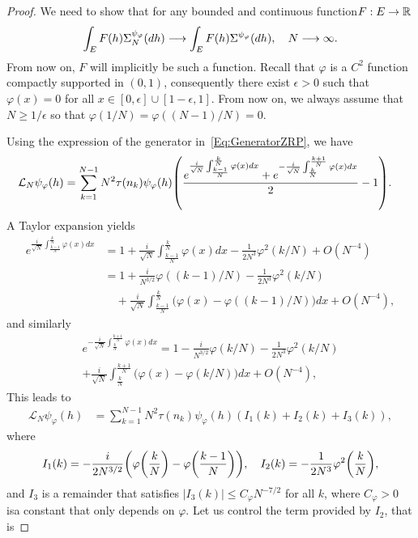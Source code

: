 \documentclass[10pt]{amsart}
\theoremstyle{definition}\newtheorem{defi}[theo]{Definition}\newtheorem{rema}[theo]{Remark}\newtheorem{exam}[theo]{Example}\newtheorem{exem}[theo]{Example}\newtheorem{nota}[theo]{Notation}
\theoremstyle{plain}
\newcommand{\cL}{\mathcal{L}}
\newcommand{\R}{\mathbb{R}}
\let\originalleft\left
\let\originalright\right
\renewcommand{\left}{\mathopen{}\mathclose\bgroup\originalleft}
\renewcommand{\right}{\aftergroup\egroup\originalright}
\renewcommand*{\to}{\mathchoice{\longrightarrow}{\rightarrow}{\rightarrow}{\rightarrow}}
\begin{document}
\begin{proof}
We need to show that for any bounded and continuous function\linebreak ${F:E\to\R}$
\[
\int_E F(h) \Sigma_N^{\psi_\varphi}(dh) \to \int_E F(h) \Sigma^{\psi_\varphi}(dh),\quad N\to\infty.
\]
From now on, $F$ will implicitly be such a function. Recall that $\varphi$ is a $C^2$ function compactly supported in $(0,1)$, consequently there exist $\epsilon > 0$ such that $\varphi(x) = 0$ for all $x\in [0,\epsilon]\cup [1-\epsilon,1]$. From now on, we always assume that $N\ge 1/\epsilon$ so that $\varphi(1/N) = \varphi((N-1)/N) = 0$.

Using the expression of the generator in~\eqref{Eq:GeneratorZRP}, we have
\begin{align*}
\cL_N \psi_\varphi(h) &= \sum_{k = 1}^{N-1} N^2\tau(n_k) \psi_\varphi(h) \left(\frac{e^{\frac{i}{\sqrt{N}}\int_{\frac{k-1}{N}}^{\frac{k}{N}} \varphi(x)dx} + e^{-\frac{i}{\sqrt{N}}\int_{\frac{k}{N}}^{\frac{k+1}{N}} \varphi(x)dx}}{2} -1 \right).
\end{align*}
A Taylor expansion yields
\begin{align*}
e^{\frac{i}{\sqrt{N}}\int_{\frac{k-1}{N}}^{\frac{k}{N}} \varphi(x)dx} &= 1 + \frac{i}{\sqrt{N}}\int_{\frac{k-1}{N}}^{\frac{k}{N}} \varphi(x)dx - \frac1{2N^3} \varphi^2(k/N) + O(N^{-4})\\
&= 1 + \frac{i}{N^{3/2}} \varphi((k-1)/N) - \frac1{2N^3} \varphi^2(k/N)\\
&\quad+ \frac{i}{\sqrt{N}}\int_{\frac{k-1}{N}}^{\frac{k}{N}} \bigl(\varphi(x)-\varphi((k-1)/N)\bigr)dx + O(N^{-4}),
\end{align*}
and similarly
\begin{multline*}
e^{-\frac{i}{\sqrt{N}}\int_{\frac{k}{N}}^{\frac{k+1}{N}} \varphi(x)dx} = 1 - \frac{i}{N^{3/2}} \varphi(k/N) - \frac1{2N^3} \varphi^2(k/N)\\
+ \frac{i}{\sqrt{N}}\int_{\frac{k}{N}}^{\frac{k+1}{N}} \bigl(\varphi(x)-\varphi(k/N)\bigr)dx + O(N^{-4}),
\end{multline*}
This leads to
\begin{align*}
\cL_N \psi_\varphi(h) &= \sum_{k = 1}^{N-1} N^2\tau(n_k) \psi_\varphi(h) (I_1(k) + I_2(k) + I_3(k)),
\end{align*}
where
\[
I_1(k) = - \frac{i}{2N^{3/2}} \left(\varphi\left(\frac{k}{N}\right) - \varphi\left(\frac{k-1}{N}\right)\right),\quad I_2(k) = - \frac1{2N^3} \varphi^2\left(\frac{k}{N}\right),
\]
and $I_3$ is a remainder that satisfies $|I_3(k)| \le C_\varphi N^{-7/2}$ for all $k$, where $C_\varphi > 0$ is\linebreak a constant that only depends on $\varphi$. Let us control the term provided by $I_2$, that is

\end{proof}
\end{document}
